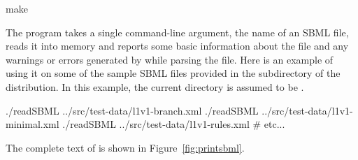 \documentclass{sbmlmanual}
\begin{document}
\begin{example}[csh]
  make
\end{example}

The  program takes a single command-line argument, the name
of an SBML file, reads it into memory and reports some basic information
about the file and any warnings or errors generated by \libsbml{} while
parsing the file.  Here is an example of using it on some of the sample
SBML files provided in the  subdirectory of the
\libsbml{} distribution.  In this example, the current directory is assumed
to be .

\begin{example}[csh]
  ./readSBML ../src/test-data/l1v1-branch.xml
  ./readSBML ../src/test-data/l1v1-minimal.xml
  ./readSBML ../src/test-data/l1v1-rules.xml
  # etc...
\end{example}


The complete text of  is shown in Figure~\vref{fig:printsbml}.
\end{document}

